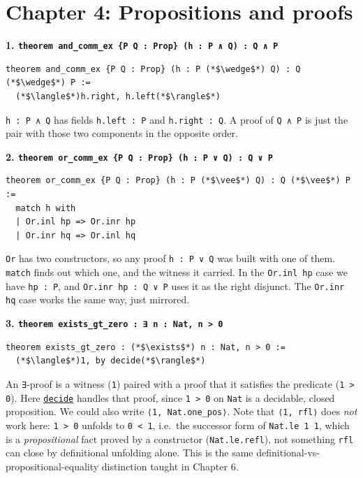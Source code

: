 \section{Chapter 4: Propositions and proofs}\label{sec:15-appendix-solutions:04-chapter-4:1}

\textbf{1. \texttt{theorem and\_\allowbreak{}comm\_\allowbreak{}ex \{P Q : Prop\} (h : P ∧ Q) : Q ∧ P}}

\begin{lstlisting}
theorem and_comm_ex {P Q : Prop} (h : P (*$\wedge$*) Q) : Q (*$\wedge$*) P :=
  (*$\langle$*)h.right, h.left(*$\rangle$*)
\end{lstlisting}

\texttt{h : P ∧ Q} has fields \texttt{h.left : P} and \texttt{h.right : Q}. A proof of \texttt{Q ∧ P} is just the pair with those two components in the opposite order.

\textbf{2. \texttt{theorem or\_\allowbreak{}comm\_\allowbreak{}ex \{P Q : Prop\} (h : P ∨ Q) : Q ∨ P}}

\begin{lstlisting}
theorem or_comm_ex {P Q : Prop} (h : P (*$\vee$*) Q) : Q (*$\vee$*) P :=
  match h with
  | Or.inl hp => Or.inr hp
  | Or.inr hq => Or.inl hq
\end{lstlisting}

\texttt{Or} has two constructors, so any proof \texttt{h : P ∨ Q} was built with one of them. \texttt{match} finds out which one, and the witness it carried. In the \texttt{Or.inl hp} case we have \texttt{hp : P}, and \texttt{Or.inr hp : Q ∨ P} uses it as the right disjunct. The \texttt{Or.inr hq} case works the same way, just mirrored.

\textbf{3. \texttt{theorem exists\_\allowbreak{}gt\_\allowbreak{}zero : ∃ n : Nat, n > 0}}

\begin{lstlisting}
theorem exists_gt_zero : (*$\exists$*) n : Nat, n > 0 :=
  (*$\langle$*)1, by decide(*$\rangle$*)
\end{lstlisting}

An \texttt{∃}-proof is a witness (\texttt{1}) paired with a proof that it satisfies the predicate (\texttt{1 > 0}). Here \href{https://lean-lang.org/doc/reference/latest/Tactic-Proofs/Tactic-Reference/}{\texttt{decide}} handles that proof, since \texttt{1 > 0} on \texttt{Nat} is a decidable, closed proposition. We could also write \texttt{⟨1, Nat.one\_\allowbreak{}pos⟩}. Note that \texttt{⟨1, rfl⟩} does \emph{not} work here: \texttt{1 > 0} unfolds to \texttt{0 < 1}, i.e.~the successor form of \texttt{Nat.le 1 1}, which is a \emph{propositional} fact proved by a constructor (\texttt{Nat.le.refl}), not something \texttt{rfl} can close by definitional unfolding alone. This is the same definitional-vs-propositional-equality distinction taught in Chapter 6.

